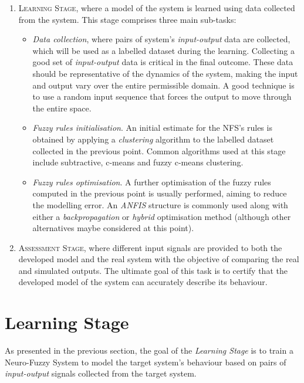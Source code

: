 \documentclass[11pt]{article}
\begin{document}
\begin{enumerate}
	\item \textsc{Learning Stage}, where a model of the system is learned using data collected from the system. This stage comprises three main sub-tasks:
	
	\begin{itemize}
		\item \emph{Data collection}, where pairs of system's \emph{input-output} data are collected, which will be used as a labelled dataset during the learning. Collecting a good set of \emph{input-output} data is critical in the final outcome. These data should be representative of the dynamics of the system, making the input and output vary over the entire permissible domain. A good technique is to use a random input sequence that forces the output to move through the entire space.
		
		\item \emph{Fuzzy rules initialisation}. An initial estimate for the NFS's rules is obtained by applying a \emph{clustering} algorithm to the labelled dataset collected in the previous point. Common algorithms used at this stage include subtractive, c-means and fuzzy c-means clustering.
		
		\item \emph{Fuzzy rules optimisation}. A further optimisation of the fuzzy rules computed in the previous point is usually performed, aiming to reduce the modelling error. An \emph{ANFIS} structure is commonly used along with either a \emph{backpropagation} or \emph{hybrid} optimisation method (although other alternatives maybe considered at this point).
		
	\end{itemize}
	
	\item \textsc{Assessment Stage}, where different input signals are provided to both the developed model and the real system with the objective of comparing the real and simulated outputs. The ultimate goal of this task is to certify that the developed model of the system can accurately describe its behaviour.
\end{enumerate}

\section{Learning Stage}
\label{fase_a}

As presented in the previous section, the goal of the \emph{Learning Stage} is to train a Neuro-Fuzzy System to model the target system's behaviour based on pairs of \emph{input-output} signals collected from the target system.
\end{document}
